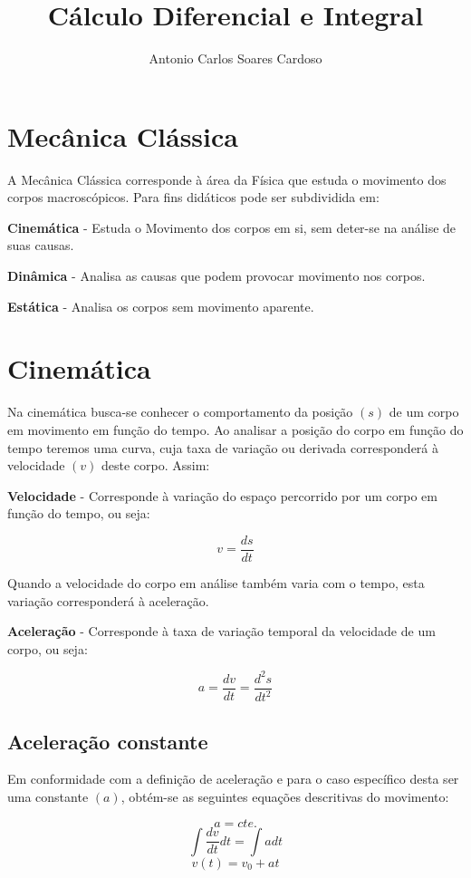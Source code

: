 \documentclass[
    12pt, %
    openright,
    twoside, %
    a4paper, %
    article,
    english,brazil %
]{abntex2}
\author{Antonio Carlos Soares Cardoso}
\title{Cálculo Diferencial e Integral}
\makeatletter
\renewcommand\tableofcontents{%
  \null\hfill\textbf{\Large\contentsname}\hfill\null\par
  \@mkboth{\MakeUppercase\contentsname}{\MakeUppercase\contentsname}%
  \@starttoc{toc}%
}
\makeatother
\begin{document}
\tableofcontents

\newpage

\textual

\section{Mecânica Clássica}

A Mecânica Clássica corresponde à área da Física que estuda o movimento dos corpos macroscópicos. Para fins didáticos pode ser subdividida em:

\item \textbf{Cinemática} - Estuda o Movimento dos corpos em si, sem deter-se na análise de suas causas.
\item \textbf{Dinâmica} - Analisa as causas que podem provocar movimento nos corpos.
\item \textbf{Estática} - Analisa os corpos sem movimento aparente.

\section{Cinemática}

Na cinemática busca-se conhecer o comportamento da posição $(s)$ de um corpo em movimento em função do tempo. Ao analisar a posição do corpo em função do tempo teremos uma curva, cuja taxa de variação ou derivada corresponderá à velocidade $(v)$ deste corpo. Assim:

\textbf{Velocidade} - Corresponde à variação do espaço percorrido por um corpo em função do tempo, ou seja:

$$ v = \frac{ds}{dt} $$

Quando a velocidade do corpo em análise também varia com o tempo, esta variação corresponderá à aceleração.

\textbf{Aceleração} - Corresponde à taxa de variação temporal da velocidade de um corpo, ou seja:

$$ a = \frac{dv}{dt} = \frac{d^2s}{dt^2}$$

\subsection{Aceleração constante}

Em conformidade com a definição de aceleração e para o caso específico desta ser uma constante $(a)$, obtém-se as seguintes equações descritivas do movimento:

$$ a = cte. $$
$$ \int \frac{dv}{dt} dt = \int a dt$$
$$ v(t) = v_0 + at $$
\end{document}
